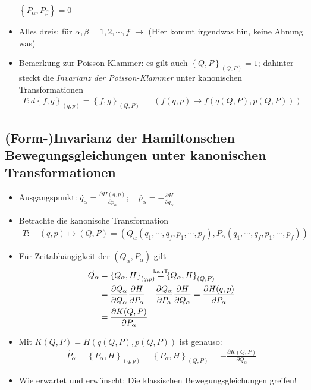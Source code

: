 \begin{itemize}
$\left\{ P_{\alpha}, P_{\beta} \right\} = 0$

\item Alles dreis: für $\alpha,\beta = 1,2,\cdots,f$
  $\rightarrow$ (Hier kommt irgendwas hin, keine Ahnung was)

\item Bemerkung zur Poisson-Klammer: es gilt auch
  $\left\{ Q,P \right\}_{(Q,P)} = 1$; dahinter steckt die
  \emph{Invarianz der Poisson-Klammer} unter kanonischen
  Transformationen
\begin{align*}
T: d \left\{ f,g \right\}_{(q,p)} = \left\{ f,g \right\}_{(Q,P)}
&&\left(f(q,p) \rightarrow f(q(Q,P), p(Q,P)) \right)
\end{align*}
\end{itemize}


\subsection{(Form-)Invarianz der Hamiltonschen Bewegungsgleichungen
  unter kanonischen Transformationen}
\begin{itemize}
\item Ausgangspunkt:
  $\dot{q_{\alpha}} = \frac{\partial H(q,p)}{\partial
    p_{\alpha}};\quad \dot{p_{\alpha}} = - \frac{\partial H}{\partial
    q_{\alpha}}$
\item Betrachte die kanonische Transformation
  \begin{align*}
    T:\quad (q,p) \mapsto (Q,P) = \left(
    Q_{\alpha}(q_1,\cdots,q_f,p_1,\cdots,p_f ),
    P_{\alpha}(q_1,\cdots,q_f,p_1,\cdots,p_f) \right)
  \end{align*}
\item Für Zeitabhängigkeit der $\left( Q_{\alpha}, P_{\alpha} \right)$
  gilt
  \begin{align*}
    \dot{Q_{\alpha}}
    &= \left\{ Q_{\alpha}, H \right\}_{(q,p)}
      \stackrel{\mathclap{\text{kanT}}}{=} \left\{ Q_{\alpha}, H \right\}_{(Q,P)}\\
    &= \frac{\partial Q_{\alpha}}{\partial Q_{\alpha}}\frac{\partial H}{\partial P_{\alpha}}
      - \frac{\partial Q_{\alpha}}{\partial P_{\alpha}}\frac{\partial H}{\partial Q_{\alpha}}
      = \frac{\partial H(q,p)}{\partial P_{\alpha}}\\
    &= \frac{\partial K(Q,P)}{\partial P_{\alpha}}
  \end{align*}
\item Mit $K(Q,P) = H(q(Q,P),p(Q,P))$ ist genauso:
  \begin{align*}
    \dot{P_{\alpha}} = \left\{ P_{\alpha}, H \right\}_{(q,p)} = \left\{
    P_{\alpha},H \right\}_{(Q,P)} = - \frac{\partial K(Q,P)}{\partial
    Q_{\alpha}}
\end{align*}

\item Wie erwartet und erwünscht: Die klassischen Bewegungsgleichungen
  greifen!
\end{itemize}

